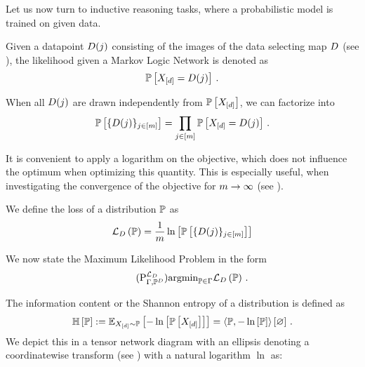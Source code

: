 
Let us now turn to inductive reasoning tasks, where a probabilistic model is trained on given data.


Given a datapoint $D(j)$ consisting of the images of the data selecting map $D$ (see ), the likelihood given a Markov Logic Network is denoted as
	\[ \mathbb{P}\left[X_{[d]} = D(j)\right] \, . \]
	
When all $D(j)$ are drawn independently from $\mathbb{P}\left[X_{[d]}\right]$, we can factorize into
	\[ \mathbb{P}\left[\{D(j)\}_{j\in[m]}\right]  = \prod_{j\in[m]} \mathbb{P}\left[X_{[d]}=D(j)\right] \, . \]

It is convenient to apply a logarithm on the objective, which does not influence the optimum when optimizing this quantity.
This is especially useful, when investigating the convergence of the objective for $m\rightarrow\infty$ (see ).

\begin{definition}\label{def:loss}
	We define the loss of a distribution $\mathbb{P}$ as
	\begin{align*}%
		\lossof{\probtensor} 
		= \frac{1}{\datanum} \lnof{\probat{\data}}
	\end{align*}
\end{definition}

We now state the Maximum Likelihood Problem in the form
\begin{align}\tag{$\probtagtypeinst{\loss}{\Gamma,\empdistribution}$}\label{prob:parameterMaxLikelihood}
	\argmin_{\probtensor\in\Gamma} \lossof{\probtensor} \, . %
\end{align}






\begin{definition}
	The information content or the Shannon entropy of a distribution is defined as
		\[ \mathbb{H}\left[\mathbb{P}\right] 
		:= \mathbb{E}_{X_{[d]}\sim\mathbb{P}}\left[-\ln \left[ \mathbb{P}\left[X_{[d]}\right] \right]\right]
		= \left\langle \mathbb{P},-\ln \left[ \mathbb{P} \right]\right\rangle \left[ \varnothing \right] \, . \]
	We depict this in a tensor network diagram with an ellipsis denoting a coordinatewise transform (see ) with a natural logarithm $\ln$ as:
	\begin{center}
		
	\end{center}
\end{definition}

